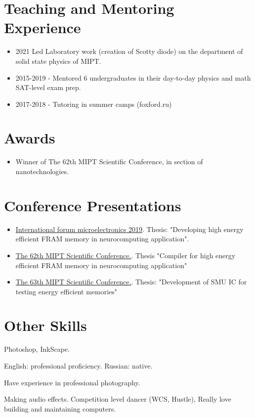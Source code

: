 \documentclass{article}
\begin{document}
\section{Teaching and Mentoring Experience }
\begin{itemize}
\item 2021 Led Laboratory work (creation of Scotty diode) on the department of solid state physics of MIPT. 
\item 2015-2019 - Mentored 6 undergraduates in their day-to-day physics and math SAT-level exam prep.
\item 2017-2018 - Tutoring in summer camps (foxford.ru)
\end{itemize}
 
\section{Awards}
\begin{itemize}
\item Winner of The 62th MIPT Scientific Conference, in section of nanotechnologies.
\end{itemize}
 
\section{Conference Presentations }
 
\begin{itemize}
\item \href{https://microelectronica.pro/}{International forum microelectronics 2019}. Thesis: "Developing high energy efficient FRAM memory in neurocomputing application".
\item  \href{https://conf62.mipt.ru/}{The 62th MIPT Scientific Conference.}. Thesis "Compiler for high energy efficient FRAM memory in neurocomputing application"
\item \href{https://mipt.ru/science/5top100/education/courseproposal/%D0%A4%D0%AD%D0%A4%D0%9C.pdf}{The 63th MIPT Scientific Conference.}. Thesis: "Development of SMU IC for testing energy efficient memories"
\end{itemize}
 
 
 
 
\section{Other Skills}
\begin{description}[widest=Langauges]
\item[Software]  Photoshop, InkScape.
\item[Languages] English: professional proficiency.  Russian: native.
\item[Photography] Have experience in professional photography.
\item[Hobbies] Making audio effects. Competition level dancer (WCS, Hustle), Really love building and maintaining computers.
\end{description}
 
\end{document}
